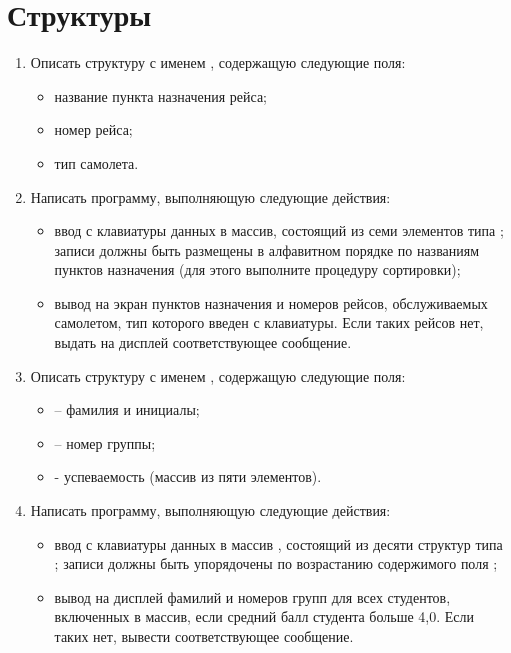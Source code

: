 \chapter{Структуры}
\begin{enumerate}[leftmargin=*]
    \item Описать структуру с именем , содержащую следующие поля:
        \begin{itemize}
            \item название пункта назначения рейса;
            \item номер рейса;
            \item тип самолета.
        \end{itemize}
    \item Написать программу, выполняющую следующие действия:
        \begin{itemize}
            \item ввод с клавиатуры данных в массив, состоящий из семи элементов типа ; записи должны быть размещены в алфавитном порядке по названиям пунктов назначения (для этого выполните процедуру сортировки);
            \item вывод на экран пунктов назначения и номеров рейсов, обслуживаемых самолетом, тип которого введен с клавиатуры. Если таких рейсов нет, выдать на дисплей соответствующее сообщение.
        \end{itemize}
    \item Описать структуру с именем , содержащую следующие поля:
        \begin{itemize}
            \item {} – фамилия и инициалы;
            \item {} – номер группы;
            \item {} - успеваемость (массив из пяти элементов).
        \end{itemize}
    \item Написать программу, выполняющую следующие действия:
        \begin{itemize}
            \item ввод с клавиатуры данных в массив , состоящий из десяти структур типа ; записи должны быть упорядочены по возрастанию содержимого поля ;
            \item вывод на дисплей фамилий и номеров групп для всех студентов, включенных в массив, если средний балл студента больше 4,0. Если таких нет, вывести соответствующее сообщение.

\end{itemize}
\end{enumerate}
